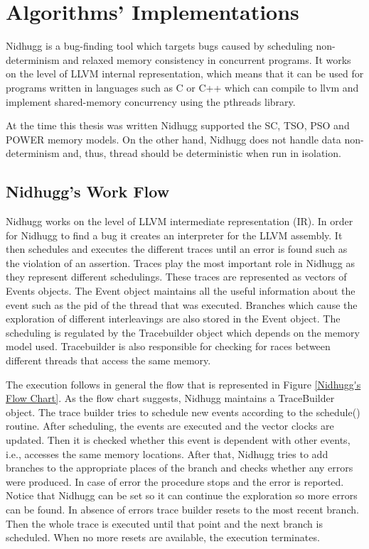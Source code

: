 \chapter{Algorithms' Implementations}

Nidhugg is a bug-finding tool which targets bugs caused by scheduling non-determinism
and relaxed memory consistency in concurrent programs. It works on the
level of LLVM internal representation, which means that it can be used
for programs written in languages such as C or C++ which can compile to llvm and implement shared-memory concurrency using the pthreads
library.

At the time this thesis was written Nidhugg supported the SC, TSO, PSO and POWER memory
models. On the other hand, Nidhugg does not handle data non-determinism and, thus,
thread should be deterministic when run in isolation.

\section{Nidhugg's Work Flow}

Nidhugg works on the level of LLVM intermediate representation (IR). In order for Nidhugg to find a bug it creates an
interpreter for the LLVM assembly. It then schedules and executes the different traces until an error is found such as
the violation of an assertion. Traces play the most important role in Nidhugg as they represent different schedulings.
These traces are represented as vectors of Events objects. The Event object maintains all the useful information about
the event such as the pid of the thread that was executed. Branches which cause the exploration of different
interleavings are also stored in the Event object. The scheduling is regulated by the Tracebuilder object which depends
on the memory model used. Tracebuilder is also responsible for checking for races between different threads that access
the same memory.

The execution follows in general the flow that is represented in Figure \ref{Nidhugg's Flow Chart}. As the flow chart
suggests, Nidhugg maintains a TraceBuilder object. The trace builder tries to schedule new events according to the
schedule() routine. After scheduling, the events are executed and the vector clocks are updated. Then it is checked
whether this event is dependent with other events, i.e., accesses the same memory locations. After that, Nidhugg tries
to add branches to the appropriate places of the branch and checks whether any errors were produced. In case of error
the procedure stops and the error is reported. Notice that Nidhugg can be set so it can continue the exploration so more
errors can be found. In absence of errors trace builder resets to the most recent branch. Then the whole trace is
executed until that point and the next branch is scheduled. When no more resets are available, the execution terminates.

